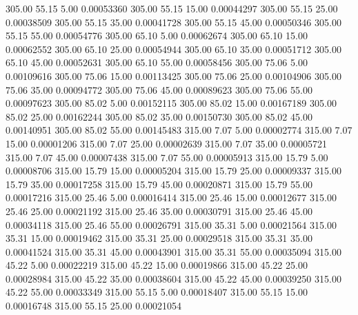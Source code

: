     305.00     55.15      5.00     0.00053360
    305.00     55.15     15.00     0.00044297
    305.00     55.15     25.00     0.00038509
    305.00     55.15     35.00     0.00041728
    305.00     55.15     45.00     0.00050346
    305.00     55.15     55.00     0.00054776
    305.00     65.10      5.00     0.00062674
    305.00     65.10     15.00     0.00062552
    305.00     65.10     25.00     0.00054944
    305.00     65.10     35.00     0.00051712
    305.00     65.10     45.00     0.00052631
    305.00     65.10     55.00     0.00058456
    305.00     75.06      5.00     0.00109616
    305.00     75.06     15.00     0.00113425
    305.00     75.06     25.00     0.00104906
    305.00     75.06     35.00     0.00094772
    305.00     75.06     45.00     0.00089623
    305.00     75.06     55.00     0.00097623
    305.00     85.02      5.00     0.00152115
    305.00     85.02     15.00     0.00167189
    305.00     85.02     25.00     0.00162244
    305.00     85.02     35.00     0.00150730
    305.00     85.02     45.00     0.00140951
    305.00     85.02     55.00     0.00145483
    315.00      7.07      5.00     0.00002774
    315.00      7.07     15.00     0.00001206
    315.00      7.07     25.00     0.00002639
    315.00      7.07     35.00     0.00005721
    315.00      7.07     45.00     0.00007438
    315.00      7.07     55.00     0.00005913
    315.00     15.79      5.00     0.00008706
    315.00     15.79     15.00     0.00005204
    315.00     15.79     25.00     0.00009337
    315.00     15.79     35.00     0.00017258
    315.00     15.79     45.00     0.00020871
    315.00     15.79     55.00     0.00017216
    315.00     25.46      5.00     0.00016414
    315.00     25.46     15.00     0.00012677
    315.00     25.46     25.00     0.00021192
    315.00     25.46     35.00     0.00030791
    315.00     25.46     45.00     0.00034118
    315.00     25.46     55.00     0.00026791
    315.00     35.31      5.00     0.00021564
    315.00     35.31     15.00     0.00019462
    315.00     35.31     25.00     0.00029518
    315.00     35.31     35.00     0.00041524
    315.00     35.31     45.00     0.00043901
    315.00     35.31     55.00     0.00035094
    315.00     45.22      5.00     0.00022219
    315.00     45.22     15.00     0.00019866
    315.00     45.22     25.00     0.00028984
    315.00     45.22     35.00     0.00038604
    315.00     45.22     45.00     0.00039250
    315.00     45.22     55.00     0.00033349
    315.00     55.15      5.00     0.00018407
    315.00     55.15     15.00     0.00016748
    315.00     55.15     25.00     0.00021054
